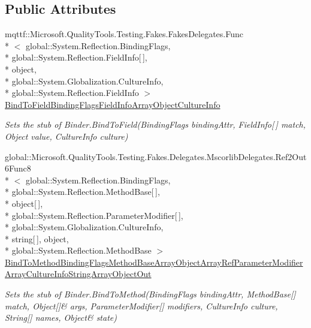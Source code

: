 \subsection*{Public Attributes}
\begin{DoxyCompactItemize}
\item 
mqttf\-::\-Microsoft.\-Quality\-Tools.\-Testing.\-Fakes.\-Fakes\-Delegates.\-Func\\*
$<$ global\-::\-System.\-Reflection.\-Binding\-Flags, \\*
global\-::\-System.\-Reflection.\-Field\-Info\mbox{[}$\,$\mbox{]}, \\*
object, \\*
global\-::\-System.\-Globalization.\-Culture\-Info, \\*
global\-::\-System.\-Reflection.\-Field\-Info $>$ \hyperlink{class_system_1_1_reflection_1_1_fakes_1_1_stub_binder_a82e7d55dc654826b909ad50208bfda0d}{Bind\-To\-Field\-Binding\-Flags\-Field\-Info\-Array\-Object\-Culture\-Info}
\begin{DoxyCompactList}\small\item\em Sets the stub of Binder.\-Bind\-To\-Field(\-Binding\-Flags binding\-Attr, Field\-Info\mbox{[}$\,$\mbox{]} match, Object value, Culture\-Info culture)\end{DoxyCompactList}\item 
global\-::\-Microsoft.\-Quality\-Tools.\-Testing.\-Fakes.\-Delegates.\-Mscorlib\-Delegates.\-Ref2\-Out6\-Func8\\*
$<$ global\-::\-System.\-Reflection.\-Binding\-Flags, \\*
global\-::\-System.\-Reflection.\-Method\-Base\mbox{[}$\,$\mbox{]}, \\*
object\mbox{[}$\,$\mbox{]}, \\*
global\-::\-System.\-Reflection.\-Parameter\-Modifier\mbox{[}$\,$\mbox{]}, \\*
global\-::\-System.\-Globalization.\-Culture\-Info, \\*
string\mbox{[}$\,$\mbox{]}, object, \\*
global\-::\-System.\-Reflection.\-Method\-Base $>$ \hyperlink{class_system_1_1_reflection_1_1_fakes_1_1_stub_binder_a0d98edce80caf8ba185062e59cebce28}{Bind\-To\-Method\-Binding\-Flags\-Method\-Base\-Array\-Object\-Array\-Ref\-Parameter\-Modifier\-Array\-Culture\-Info\-String\-Array\-Object\-Out}
\begin{DoxyCompactList}\small\item\em Sets the stub of Binder.\-Bind\-To\-Method(Binding\-Flags binding\-Attr, Method\-Base\mbox{[}\mbox{]} match, Object\mbox{[}\mbox{]}\& args, Parameter\-Modifier\mbox{[}\mbox{]} modifiers, Culture\-Info culture, String\mbox{[}\mbox{]} names, Object\& state)\end{DoxyCompactList}\item 

\end{DoxyCompactItemize}
